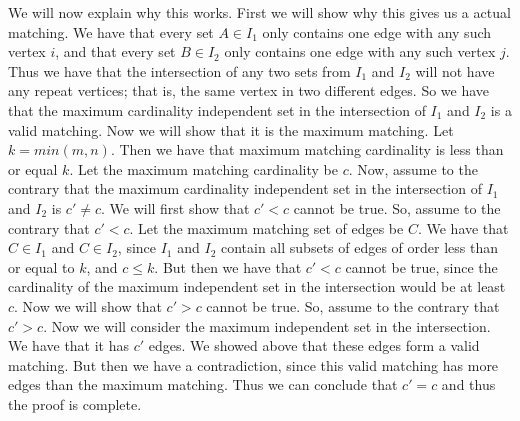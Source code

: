 \documentclass{article}
\begin{document}
We will now explain why this works. First we will show why this gives us a
actual matching. We have that every set $A \in I_1$ only contains one edge with
any such vertex $i$, and that every set $B \in I_2$ only contains one edge with
any such vertex $j$. Thus we have that the intersection of any two sets from
$I_1$ and $I_2$ will not have any repeat vertices; that is, the same vertex in
two different edges. So we have that the maximum cardinality independent set in
the intersection of $I_1$ and $I_2$ is a valid matching. Now we will show that
it is the maximum matching. Let $k = min(m,n)$. Then we have that maximum
matching cardinality is less than or equal $k$. Let the maximum matching
cardinality be $c$. Now, assume to the contrary that the maximum cardinality
independent set in the intersection of $I_1$ and $I_2$ is $c' \neq c$. We will
first show that $c' < c$ cannot be true. So, assume to the contrary that $c' <
c$. Let the
maximum matching set of edges be $C$. We have that $C \in I_1$ and $C \in I_2$,
since $I_1$ and $I_2$ contain all subsets of edges of order less than or equal
to $k$, and $c \leq k$. But then we have that $c' < c$ cannot be true, since the
cardinality of the maximum independent set in the intersection would be at least
$c$. Now we will show that $c' > c$ cannot be true. So, assume to the contrary
that $c' > c$. Now we will consider the maximum independent set in the
intersection. We have that it has $c'$ edges. We showed above that these edges
form a valid matching. But then we have a contradiction, since this valid
matching has more edges than the maximum matching. Thus we can conclude that
$c'=c$ and thus the proof is complete.
\newpage

\end{document}
